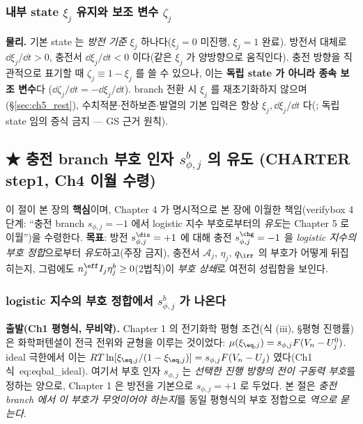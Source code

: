 \subsubsection{내부 state $\xi_j$ 유지와 보조 변수 $\zeta_j$}\label{sec:ch5_xikeep}
\textbf{물리.} 기본 state 는 \emph{방전 기준} $\xi_j$ 하나다($\xi_j=0$ 미진행, $\xi_j=1$ 완료). 방전서 대체로
$\dd\xi_j/\dd t>0$, 충전서 $\dd\xi_j/\dd t<0$ 이다(같은 $\xi_j$ 가 양방향으로 움직인다). 충전 방향을 직관적으로
표기할 때 $\zeta_j\equiv1-\xi_j$ 를 쓸 수 있으나, 이는 \textbf{독립 state 가 아니라 종속 보조 변수}다
($\dd\zeta_j/\dd t=-\dd\xi_j/\dd t$). branch 전환 시 $\xi_j$ 를 재초기화하지 않으며(\S\ref{sec:ch5_rest}),
수치적분$\cdot$전하보존$\cdot$발열의 기본 입력은 항상 $\xi_j,\dd\xi_j/\dd t$ 다(; 독립 state 임의
증식 금지 — GS 근거 원칙).

\subsection{★ 충전 branch 부호 인자 $s_{\phi,j}^b$ 의 유도 (CHARTER step1, Ch4 이월 수령)}\label{sec:ch5_chargesign}
이 절이 본 장의 \textbf{핵심}이며, Chapter 4 가 명시적으로 본 장에 이월한 책임(verifybox 4단계: ``충전 branch
$s_{\phi,j}=-1$ 에서 logistic 지수 부호로부터의 \emph{유도}는 Chapter 5 로 이월'')을 수령한다. \textbf{목표}:
방전 $s_{\phi,j}^\dis=+1$ 에 대해 충전 $s_{\phi,j}^\chg=-1$ 을 \emph{logistic 지수의 부호 정합}으로부터
\emph{유도}하고(주장 금지), 충전서 $\mathcal A_j$, $\eta_j$, $q_\irr$ 의 부호가 어떻게 뒤집히는지, 그럼에도
$n_j^{\eff}I_j\eta_j^b\ge0$(2법칙)이 \emph{부호 상쇄}로 여전히 성립함을 보인다.

\subsubsection{logistic 지수의 부호 정합에서 $s_{\phi,j}^b$ 가 나온다}\label{sec:ch5_sign_derive}
\textbf{출발(Ch1 평형식, 무비약).} Chapter 1 의 전기화학 평형 조건(식 (iii), \S 평형 진행률)은 화학퍼텐셜이
전극 전위와 균형을 이루는 것이었다: $\mu(\xi_{\eq,j})=s_{\phi,j}F(V_n-U_j^0)$. ideal 극한에서 이는
$RT\ln[\xi_{\eq,j}/(1-\xi_{\eq,j})]=s_{\phi,j}F(V_n-U_j)$ 였다(Ch1 식~eq:eqbal\_ideal). 여기서 부호 인자
$s_{\phi,j}$ 는 \emph{선택한 진행 방향의 전이 구동력 부호}를 정하는 양으로, Chapter 1 은 방전을 기본으로
$s_{\phi,j}=+1$ 로 두었다. 본 절은 \emph{충전 branch 에서 이 부호가 무엇이어야 하는지}를 동일 평형식의 부호
정합으로 \emph{역으로 묻는다}.


